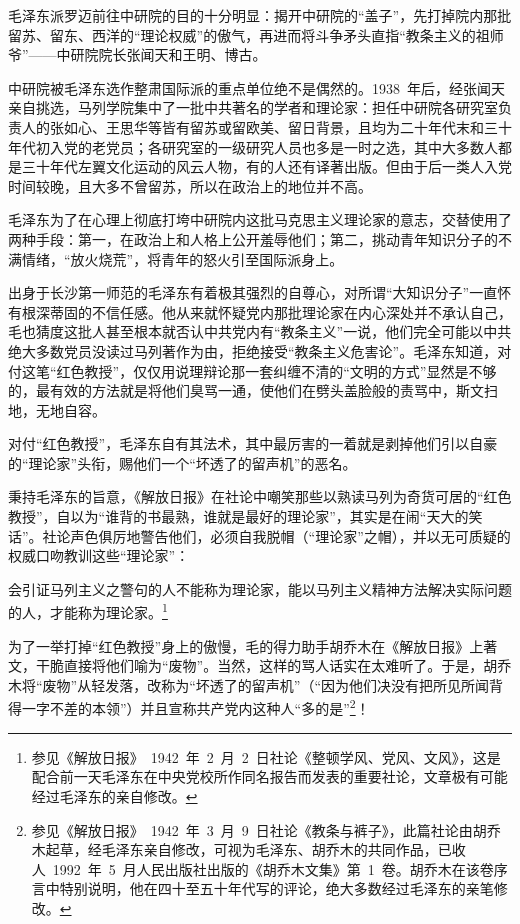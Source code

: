 毛泽东派罗迈前往中研院的目的十分明显：揭开中研院的“盖子”，先打掉院内那批留苏、留东、西洋的“理论权威”的傲气，再进而将斗争矛头直指“教条主义的祖师爷”——中研院院长张闻天和王明、博古。

中研院被毛泽东选作整肃国际派的重点单位绝不是偶然的。1938~年后，经张闻天亲自挑选，马列学院集中了一批中共著名的学者和理论家：担任中研院各研究室负责人的张如心、王思华等皆有留苏或留欧美、留日背景，且均为二十年代末和三十年代初入党的老党员；各研究室的一级研究人员也多是一时之选，其中大多数人都是三十年代左翼文化运动的风云人物，有的人还有译著出版。但由于后一类人入党时间较晚，且大多不曾留苏，所以在政治上的地位并不高。

毛泽东为了在心理上彻底打垮中研院内这批马克思主义理论家的意志，交替使用了两种手段：第一，在政治上和人格上公开羞辱他们；第二，挑动青年知识分子的不满情绪，“放火烧荒”，将青年的怒火引至国际派身上。

出身于长沙第一师范的毛泽东有着极其强烈的自尊心，对所谓“大知识分子”一直怀有根深蒂固的不信任感。他从来就怀疑党内那批理论家在内心深处并不承认自己，毛也猜度这批人甚至根本就否认中共党内有“教条主义”一说，他们完全可能以中共绝大多数党员没读过马列著作为由，拒绝接受“教条主义危害论”。毛泽东知道，对付这笔“红色教授”，仅仅用说理辩论那一套纠缠不清的“文明的方式”显然是不够的，最有效的方法就是将他们臭骂一通，使他们在劈头盖脸般的责骂中，斯文扫地，无地自容。

对付“红色教授”，毛泽东自有其法术，其中最厉害的一着就是剥掉他们引以自豪的“理论家”头衔，赐他们一个“坏透了的留声机”的恶名。

秉持毛泽东的旨意，《解放日报》在社论中嘲笑那些以熟读马列为奇货可居的“红色教授”，自以为“谁背的书最熟，谁就是最好的理论家”，其实是在闹“天大的笑话”。社论声色俱厉地警告他们，必须自我脱帽（“理论家”之帽），并以无可质疑的权威口吻教训这些“理论家”：

\begin{quoting}
会引证马列主义之警句的人不能称为理论家，能以马列主义精神方法解决实际问题的人，才能称为理论家。\footnote{参见《解放日报》~1942~年~2~月~2~日社论《整顿学风、党风、文风》，这是配合前一天毛泽东在中央党校所作同名报告而发表的重要社论，文章极有可能经过毛泽东的亲自修改。}
\end{quoting}
为了一举打掉“红色教授”身上的傲慢，毛的得力助手胡乔木在《解放日报》上著文，干脆直接将他们喻为“废物”。当然，这样的骂人话实在太难听了。于是，胡乔木将“废物”从轻发落，改称为“坏透了的留声机”（“因为他们决没有把所见所闻背得一字不差的本领”）并且宣称共产党内这种人“多的是”\footnote{参见《解放日报》~1942~年~3~月~9~日社论《教条与裤子》，此篇社论由胡乔木起草，经毛泽东亲自修改，可视为毛泽东、胡乔木的共同作品，已收人~1992~年~5~月人民出版社出版的《胡乔木文集》第~1~卷。胡乔木在该卷序言中特别说明，他在四十至五十年代写的评论，绝大多数经过毛泽东的亲笔修改。}！

